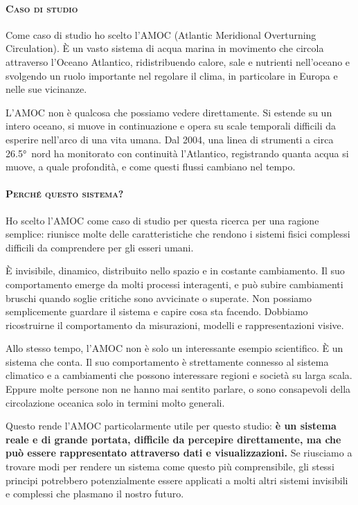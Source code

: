 \paragraph{\textsc{Caso di studio}}
Come caso di studio ho scelto l'AMOC (Atlantic Meridional Overturning Circulation). È un vasto
sistema di acqua marina in movimento che circola attraverso l'Oceano Atlantico, ridistribuendo
calore, sale e nutrienti nell'oceano e svolgendo un ruolo importante nel regolare il clima, in
particolare in Europa e nelle sue vicinanze.

L'AMOC non è qualcosa che possiamo vedere direttamente. Si estende su un intero oceano, si muove in
continuazione e opera su scale temporali difficili da esperire nell'arco di una vita umana. Dal
2004, una linea di strumenti a circa \ang{26.5}~nord ha monitorato con continuità l'Atlantico,
registrando quanta acqua si muove, a quale profondità, e come questi flussi cambiano nel tempo.

\paragraph{\textsc{Perché questo sistema?}}
Ho scelto l'AMOC come caso di studio per questa ricerca per una ragione semplice: riunisce molte
delle caratteristiche che rendono i sistemi fisici complessi difficili da comprendere per gli esseri
umani.

È invisibile, dinamico, distribuito nello spazio e in costante cambiamento. Il suo comportamento
emerge da molti processi interagenti, e può subire cambiamenti bruschi quando soglie critiche sono
avvicinate o superate. Non possiamo semplicemente guardare il sistema e capire cosa sta facendo.
Dobbiamo ricostruirne il comportamento da misurazioni, modelli e rappresentazioni visive.

Allo stesso tempo, l'AMOC non è solo un interessante esempio scientifico. È un sistema che conta.
Il suo comportamento è strettamente connesso al sistema climatico e a cambiamenti che possono
interessare regioni e società su larga scala. Eppure molte persone non ne hanno mai sentito
parlare, o sono consapevoli della circolazione oceanica solo in termini molto generali.

Questo rende l'AMOC particolarmente utile per questo studio: \textbf{è un sistema reale e di grande
portata, difficile da percepire direttamente, ma che può essere rappresentato attraverso dati e
visualizzazioni.} Se riusciamo a trovare modi per rendere un sistema come questo più comprensibile,
gli stessi principi potrebbero potenzialmente essere applicati a molti altri sistemi invisibili e
complessi che plasmano il nostro futuro.

